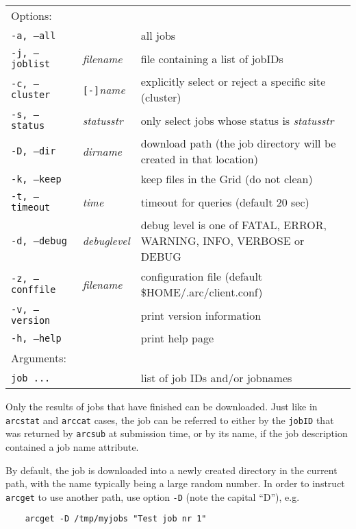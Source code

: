 \hspace*{0.5cm}
\begin{shaded}
\end{shaded}
\begin{longtable}{llp{8cm}}
   Options:&&\\
   \texttt{-a, --all}& & all jobs\\
   \texttt{-j, --joblist}& \textit{filename} & file containing a list of jobIDs\\
   \texttt{-c, --cluster}&\verb#[-]#\textit{name}&explicitly select or reject a specific site (cluster)\\
   \texttt{-s, --status}& \textit{statusstr} &only select jobs whose status is \textit{statusstr}\\
   \texttt{-D, --dir} & \textit{dirname} & download path (the job directory will be created in that location)\\
   \texttt{-k, --keep}& & keep files in the Grid (do not clean)\\
   \texttt{-t, --timeout}& \textit{time} & timeout for queries (default 20 sec)\\
   \texttt{-d, --debug}& \textit{debuglevel}&debug level is one of  FATAL, ERROR, WARNING, INFO, VERBOSE or DEBUG\\
   \texttt{-z, --conffile}&\textit{filename}& configuration file (default {\$}HOME/.arc/client.conf)\\
   \texttt{-v, --version}& & print version information\\
   \texttt{-h, --help}& & print help page\\
   Arguments:&&\\
   \texttt{job ...} && list of job IDs and/or jobnames\\
\end{longtable}

Only the results of jobs that have finished can be downloaded. Just like in \verb#arcstat#
and \verb#arccat# cases, the job can be referred to either by the \texttt{jobID} that was returned by
\texttt{arcsub} at submission time, or by its name, if the job
description contained a job name attribute.

By default, the job is downloaded into a newly created directory in the current path, with the
name typically being a large random number. In order to instruct \verb#arcget# to use another
path, use option \verb#-D# (note the capital ``D''), e.g.
\begin{verbatim}
    arcget -D /tmp/myjobs "Test job nr 1"
\end{verbatim}

